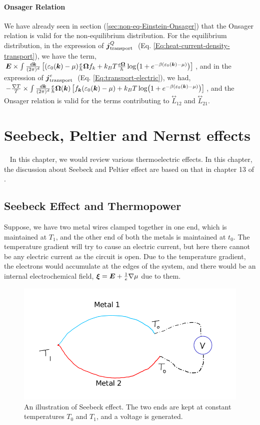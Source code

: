 \documentclass{report}
\renewcommand\vec[1]{\ensuremath\boldsymbol{#1}} %
\begin{document}
\subsubsection{Onsager Relation}
We have already seen in section (\ref{sec:non-eq-Einstein-Onsager}) that the Onsager relation is valid for the non-equilibrium distribution. For the equilibrium distribution, in the expression of $\vec{j}_{\text {transport }}^{Q}$ (Eq. \eqref{Eq:heat-current-density-transport}), we have the term, $\vec{E} \times \int \frac{d\vec{k}}{(2\pi)^d} \left[(\varepsilon_0(\vec{k})-\mu) \frac{e}{\hbar} \vec{\Omega} f_{k} + k_{B} T \frac{e \vec{\Omega}}{\hbar} \log(1 + e^{-\beta(\varepsilon_0(\vec{k}) - \mu)})\right]$, and in the expression of $\vec{j}_{\text {transport }}^{e}$ (Eq. \eqref{Eq:transport-electric}), we had, $-\frac{\nabla T}{T}  \times \int  \frac{d\vec{k}}{(2\pi)^d} \frac{e}{\hbar} \vec{\Omega}(\vec{k}) \left[f_{\vec{k}} (\varepsilon_0(\vec{k}) - \mu) + k_B T \log(1 + e^{-\beta(\varepsilon_0(\vec{k}) - \mu)})\right]$, and the Onsager relation is valid for the terms contributing to $\stackrel{\leftrightarrow}{L}_{12}$ and $\stackrel{\leftrightarrow}{L}_{21}$.

\chapter{Seebeck, Peltier and Nernst effects}~\label{chap:Seebeck-Peltier-Nernst}
In this chapter, we would review various thermoelectric effects. In this chapter, the discussion about Seebeck and Peltier effect are based on that in chapter 13 of \cite{book:AshcroftMermin76}.
\section{Seebeck Effect and Thermopower}

Suppose, we have two metal wires clamped together in one end, which is maintained at $T_1$, and the other end of both the metals is maintained at $t_0$. The temperature gradient will try to cause an electric current, but here there cannot be any electric current as the circuit is open. Due to the temperature gradient, the electrons would accumulate at the edges of the system, and there would be an internal electrochemical field, $\vec{\xi} = \vec{E} + \frac{1}{e} \nabla \mu$ due to them.
\begin{figure}[h!]
	\centering
	\includegraphics[width=0.7\linewidth]{seebeck}
	\caption{An illustration of Seebeck effect. The two ends are kept at constant temperatures $T_0$ and $T_1$, and a voltage is generated.}
	\label{fig:seebeck}
\end{figure}
\end{document}
